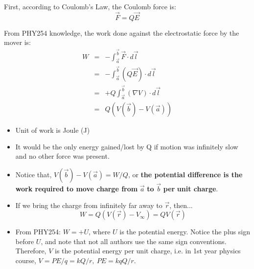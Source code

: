 \documentclass[12pt,a4paper,twoside]{article}
\numberwithin{equation}{section}
\begin{document}
    \noindent First, according to Coulomb's Law, the Coulomb force is:
    \[\overrightarrow{F}=Q\overrightarrow{E}\]
    
    \noindent From PHY254 knowledge, the work done against the electrostatic force by the mover is:
    \begin{eqnarray*}
    W &=& -\int_{\overrightarrow{a}}^{\overrightarrow{b}}\overrightarrow{F}\cdot d\overrightarrow{l}\\
    &=& -\int_{\overrightarrow{a}}^{\overrightarrow{b}}(Q\overrightarrow{E})\cdot d\overrightarrow{l}\\
    &=& +Q\int_{\overrightarrow{a}}^{\overrightarrow{b}}(\nabla V)\cdot d\overrightarrow{l}\\
    &=& Q(V(\overrightarrow{b})-V(\overrightarrow{a}))
    \end{eqnarray*}
    \begin{itemize}
        \item Unit of work is Joule (J)
        \item It would be the only energy gained/lost by Q if motion was infinitely slow and no other force was present.
        \item Notice that, \(V(\overrightarrow{b})-V(\overrightarrow{a})=W/Q\), or \textbf{the potential difference is the work required to move charge from} $\overrightarrow{a}$ \textbf{to} $\overrightarrow{b}$ \textbf{per} \textbf{unit charge}.
        \item If we bring the charge from infinitely far away to $\overrightarrow{r}$, then...
        \[W=Q(V(\overrightarrow{r})-V_\infty)=QV(\overrightarrow{r})\]
        \item From PHY254: $W=+U$, where $U$ is the potential energy. Notice the plus sign before $U$, and note that not all authors use the same sign conventions.
            \subitem Therefore, $V$ is the potential energy per unit charge, i.e. in 1st year physics course, $V=PE/q=kQ/r,\ PE=kqQ/r$.
    \end{itemize}
\end{document}
